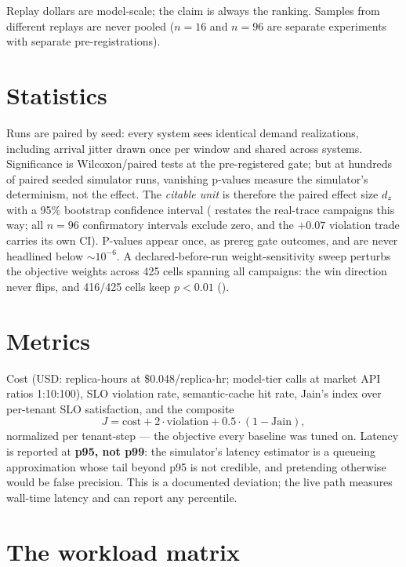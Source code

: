 Replay dollars are model-scale; the claim is always the ranking. Samples
from different replays are never pooled ($n{=}16$ and $n{=}96$ are separate
experiments with separate pre-registrations).

\section{Statistics}
\label{sec:method-stats}

Runs are paired by seed: every system sees identical demand realizations,
including arrival jitter drawn once per window and shared across systems.
Significance is Wilcoxon/paired tests at the pre-registered gate; but at
hundreds of paired seeded simulator runs, vanishing p-values measure the
simulator's determinism, not the effect. The \emph{citable unit} is
therefore the paired effect size $d_z$ with a 95\% bootstrap confidence
interval ( restates the real-trace campaigns this
way; all $n{=}96$ confirmatory intervals exclude zero, and the $+0.07$
violation trade carries its own CI). P-values appear once, as prereg gate
outcomes, and are never headlined below ${\sim}10^{-6}$. A
declared-before-run weight-sensitivity sweep perturbs the objective weights
across 425 cells spanning all campaigns: the win direction never flips, and
416/425 cells keep $p<0.01$ ().

\section{Metrics}
\label{sec:method-metrics}

Cost (USD: replica-hours at \$0.048/replica-hr; model-tier calls at market
API ratios 1:10:100), SLO violation rate, semantic-cache hit rate, Jain's
index over per-tenant SLO satisfaction, and the composite
\begin{equation}
J = \text{cost} + 2\cdot\text{violation} + 0.5\cdot(1-\text{Jain}),
\end{equation}
normalized per tenant-step --- the objective every baseline was tuned on.
Latency is reported at \textbf{p95, not p99}: the simulator's latency
estimator is a queueing approximation whose tail beyond p95 is not credible,
and pretending otherwise would be false precision. This is a documented
deviation; the live path measures wall-time latency and can report any
percentile.

\section{The workload matrix}
\label{sec:method-matrix}

